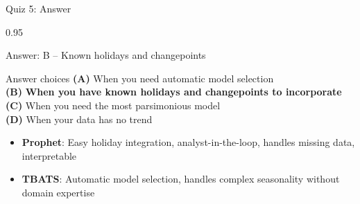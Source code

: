 \documentclass[9pt, aspectratio=169, t]{beamer}
\begin{document}
\begin{frame}{Quiz 5: Answer}
    \begin{cminipage}{0.95\textwidth}
    \begin{exampleblock}{Answer: B -- Known holidays and changepoints}

    \begin{block}{Answer choices}
        \textcolor{MainBlue}{\textbf{(A)}} When you need automatic model selection \incorrect\\[3pt]
        \textcolor{MainBlue}{\textbf{(B)}} \textbf{\textcolor{Forest}{When you have known holidays and changepoints to incorporate}} \correct\\[3pt]
        \textcolor{MainBlue}{\textbf{(C)}} When you need the most parsimonious model \incorrect\\[3pt]
        \textcolor{MainBlue}{\textbf{(D)}} When your data has no trend \incorrect
    \end{block}

        \vspace{0.3cm}

        \begin{itemize}
            \item \textbf{Prophet}: Easy holiday integration, analyst-in-the-loop, handles missing data, interpretable
            \item \textbf{TBATS}: Automatic model selection, handles complex seasonality without domain expertise
        \end{itemize}
    \end{exampleblock}

    \end{cminipage}
\end{frame}
\end{document}
